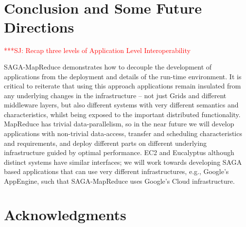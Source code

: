 \documentclass[3p,twocolumn]{elsarticle}
\newcommand{\jhanote}[1]{ {\textcolor{red} { ***SJ: #1 }}}
\newcommand{\jhanote}[1]{}
\newcommand{\sagamapreduce }{SAGA-MapReduce }
\begin{document}
\section{Conclusion and Some Future Directions}

\jhanote{Recap three levels of Application Level Interoperability}

\sagamapreduce demonstrates how to decouple the development of
applications from the deployment and details of the run-time
environment.  It is critical to reiterate that using this approach
applications remain insulated from any underlying changes in the
infrastructure -- not just Grids and different middleware layers, but
also different systems with very different semantics and
characteristics, whilst being exposed to the important distributed
functionality.  MapReduce has trivial data-parallelism, so in the near
future we will develop applications with non-trivial data-access,
transfer and scheduling characteristics and requirements, and deploy
different parts on different underlying infrastructure guided by
optimal performance.  EC2 and Eucalyptus although distinct systems
have similar interfaces; we will work towards developing SAGA based
applications that can use very different infrastructures, e.g.,
Google's AppEngine, such that \sagamapreduce uses Google's Cloud
infrastructure.







\section{Acknowledgments}
\end{document}
